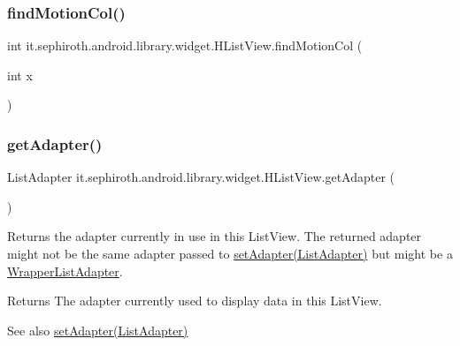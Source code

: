 \subsubsection{\texorpdfstring{find\+Motion\+Col()}{findMotionCol()}}
{\footnotesize\ttfamily int it.\+sephiroth.\+android.\+library.\+widget.\+H\+List\+View.\+find\+Motion\+Col (\begin{DoxyParamCaption}\item[{int}]{x }\end{DoxyParamCaption})\hspace{0.3cm}{\ttfamily [protected]}}

\mbox{\label{classit_1_1sephiroth_1_1android_1_1library_1_1widget_1_1_h_list_view_a70eebe0913d5f7b099e0cf880777b25d}} 
\subsubsection{\texorpdfstring{get\+Adapter()}{getAdapter()}}
{\footnotesize\ttfamily List\+Adapter it.\+sephiroth.\+android.\+library.\+widget.\+H\+List\+View.\+get\+Adapter (\begin{DoxyParamCaption}{ }\end{DoxyParamCaption})}

Returns the adapter currently in use in this List\+View. The returned adapter might not be the same adapter passed to \hyperlink{classit_1_1sephiroth_1_1android_1_1library_1_1widget_1_1_h_list_view_aae735173f3594a4e6389a9f2a54d9103}{set\+Adapter(\+List\+Adapter)} but might be a \hyperlink{}{Wrapper\+List\+Adapter}.

\begin{DoxyReturn}{Returns}
The adapter currently used to display data in this List\+View.
\end{DoxyReturn}
\begin{DoxySeeAlso}{See also}
\hyperlink{classit_1_1sephiroth_1_1android_1_1library_1_1widget_1_1_h_list_view_aae735173f3594a4e6389a9f2a54d9103}{set\+Adapter(\+List\+Adapter)} 
\end{DoxySeeAlso}
\mbox{\label{classit_1_1sephiroth_1_1android_1_1library_1_1widget_1_1_h_list_view_ad7b4d7aa2500eeea7ade9fcd1e6c31e7}} 
